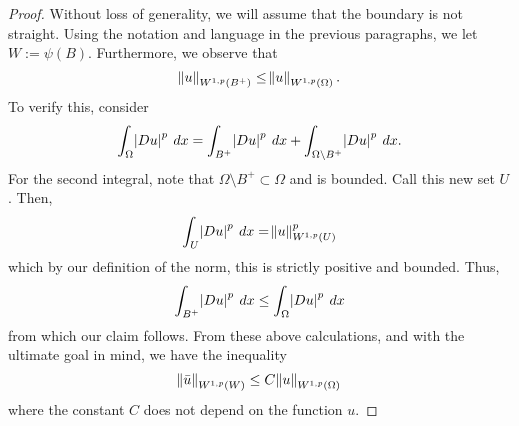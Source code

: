 \documentclass[10pt]{article}
\begin{document}
\begin{proof}
 	Without loss of generality, we will assume that the boundary is not straight. Using the notation and language in the previous paragraphs, we let $W:=\psi(B)$. Furthermore, we observe that 
 	\begin{equation*}
 		\displaystyle \norm{u}_{W^{1,p}(B^+)} \leq \norm{u}_{W^{1,p}(\Omega)}. 
 	\end{equation*}
 	To verify this, consider 
 	\begin{equation*}
 		\displaystyle \int_{\Omega}{\abs{Du}^p \: dx} = \int_{B^+}{\abs{Du}^p \: dx} + \int_{\Omega \setminus B^+}{\abs{Du}^p \: dx}. 
 	\end{equation*}
 	For the second integral, note that $\Omega \setminus B^+ \subset \Omega$ and is bounded. Call this new set $U$. Then, 
 	\begin{equation*}
 		\displaystyle \int_{U}{\abs{Du}^{p} \: dx} = \norm{u}_{W^{1,p}(U)}^p 
 	\end{equation*}
 	which by our definition of the norm, this is strictly positive and bounded. Thus, 
 	\begin{equation*}
 		\displaystyle \int_{B^+}{\abs{Du}^p \: dx} \leq \int_{\Omega}{\abs{Du}^p \: dx} 
 	\end{equation*}
 	from which our claim follows. From these above calculations, and with the ultimate goal in mind, we have the inequality 
 	\begin{equation*}
 		\displaystyle \norm{\bar{u}}_{W^{1,p}(W)} \leq C\norm{u}_{W^{1,p}(\Omega)}
 	\end{equation*}
 	where the constant $C$ does not depend on the function $u$.
 	

\end{proof}
\end{document}
